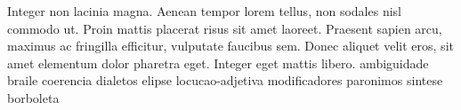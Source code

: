 \lipsum[20]

\lipsum[21]

Integer non lacinia magna. Aenean tempor lorem tellus, non sodales nisl commodo ut. Proin mattis placerat risus sit amet laoreet. Praesent sapien arcu, maximus ac fringilla efficitur, vulputate faucibus sem. Donec aliquet velit eros, sit amet elementum dolor pharetra eget. Integer eget mattis libero.
\Gls{ambiguidade}
\Gls{braile}
\Gls{coerencia}
\Gls{dialetos}
\Gls{elipse}
\Gls{locucao-adjetiva}
\Gls{modificadores}
\Gls{paronimos}
\Gls{sintese}
\Gls{borboleta}